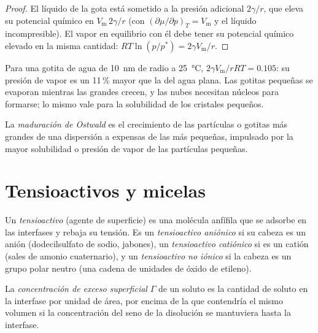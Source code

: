 \begin{proof}
El líquido de la gota está sometido a la presión adicional $2\gamma/r$, que eleva su
potencial químico en $V_{\mathrm m}\,2\gamma/r$ (con $(\partial\mu/\partial p)_T = V_{\mathrm m}$ y el líquido incompresible).
El vapor en equilibrio con él debe tener su potencial químico elevado en
la misma cantidad: $RT\ln(p/p^*) = 2\gamma V_{\mathrm m}/r$.
\end{proof}

Para una gotita de agua de \qty{10}{nm} de radio a \qty{25}{\celsius}, $2\gamma V_{\mathrm m}/rRT = 0.105$: su presión
de vapor es un 11\,\% mayor que la del agua plana. Las gotitas pequeñas se evaporan mientras
las grandes crecen, y las nubes necesitan núcleos para formarse; lo mismo vale para la
solubilidad de los cristales pequeños.

\begin{definition}\label{def:b3:colloids:ripening}
La \emph{maduración de Ostwald} es el crecimiento de las partículas
o gotitas más grandes de una dispersión a expensas de las más pequeñas,
impulsado por la mayor solubilidad o presión de vapor de las partículas pequeñas.
\end{definition}

\section{Tensioactivos y micelas}

\begin{definition}[Tensioactivo]\label{def:b3:colloids:surfactant}
Un \emph{tensioactivo} (agente de superficie) es una molécula
anfífila que se adsorbe en las interfases y rebaja su tensión. Es un
\emph{tensioactivo aniónico} si su cabeza es un anión (dodecilsulfato
de sodio, jabones), un \emph{tensioactivo catiónico}
si es un catión (sales de amonio cuaternario), y un \emph{tensioactivo no
iónico} si la cabeza es un grupo polar neutro (una
cadena de unidades de óxido de etileno).
\end{definition}

\begin{definition}\label{def:b3:colloids:surface-excess}
La \emph{concentración de exceso superficial} $\Gamma$ de un
soluto es la cantidad de soluto en la interfase por unidad de área, por encima de
la que contendría el mismo volumen si la concentración del seno de la disolución se mantuviera hasta
la interfase.
\end{definition}

